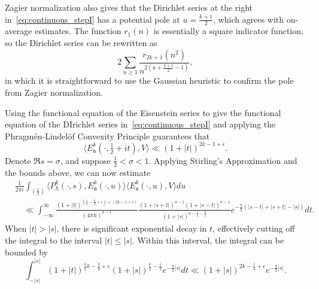\begin{remark}
  Zagier normalization also gives that the Dirichlet series at the right
  in~\eqref{eq:continuous_stepI} has a potential pole at $u = \frac{k+1}{2}$, which agrees
  with on-average estimates.
  The function $r_1(n)$ is essentially a square indicator function, so the Dirichlet
  series can be rewritten as
  \begin{equation}
    2\sum_{n \geq 1} \frac{r_{2k+1}(n^2)}{n^{2(u + \frac{k+1}{2} - 1)}},
  \end{equation}
  in which it is straightforward to use the Gaussian heuristic to confirm the pole from
  Zagier normalization.
\end{remark}


Using the functional equation of the Eisenstein series to give the functional equation of
the DIrichlet series in~\eqref{eq:continuous_stepI} and applying the Phragm\'en-Lindel\"of
Convexity Principle guarantees that
\begin{equation}
  \langle E_\mathfrak{a}^k(\cdot, \tfrac{1}{2} + it), V \rangle \ll (1 + \lvert t
  \rvert)^{2k - 1 + \epsilon}.
\end{equation}
Denote $\Re s = \sigma$, and suppose $\tfrac{1}{2} < \sigma < 1$.
Applying Stirling's Approximation and the bounds above, we can now estimate
\begin{align}
  &\frac{1}{2\pi i} \int_{(\frac{1}{2})} \langle P_h^k(\cdot, s),
E^k_{\mathfrak{a}}(\cdot, u) \rangle \langle E^k_{\mathfrak{a}}(\cdot, u), V \rangle du \\
  &\quad \ll \int_{-\infty}^\infty
  \frac{(1 + \lvert t \rvert)^{(\frac{1}{4} - \frac{k}{2} + \epsilon) + (2k - 1 +
  \epsilon)}}{(4\pi h)^{\sigma - 1}}
  \frac{(1 + \lvert s + t \rvert)^{\sigma - 1} (1 + \lvert s - t \rvert)^{\sigma - 1}}{(1
  + \lvert s \rvert)^{\sigma - \frac{1}{2} - \frac{k}{2}}}
  e^{-\frac{\pi}{2}(\lvert s - t \rvert + \lvert s + t \rvert - \lvert s \rvert)}dt.
\end{align}
When $\lvert t \rvert > \lvert s \rvert$, there is significant exponential decay in $t$,
effectively cutting off the integral to the interval $\lvert t \rvert \leq \lvert s
\rvert$.
Within this interval, the integral can be bounded by
\begin{equation}
  \int_{-\lvert s \rvert}^{\lvert s \rvert} (1 + \lvert t \rvert)^{\frac{3}{2}k -
  \frac{3}{4} + \epsilon} (1 + \lvert s \rvert)^{\frac{k}{2} - \frac{1}{2}}
  e^{-\frac{\pi}{2}\lvert s \rvert} dt \ll (1 + \lvert s \rvert)^{2k - \frac{1}{4} +
  \epsilon} e^{-\frac{\pi}{2}\lvert s \rvert}.
\end{equation}


